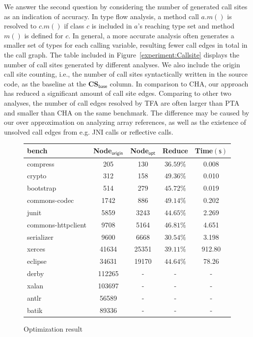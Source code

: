 \documentclass{llncs}
\begin{document}
We answer the second question by considering the number of generated call sites as an indication of accuracy. In type flow analysis, a method call $a.m()$ is resolved to $c.m()$ if class $c$ is included in $a$'s reaching type set and method $m()$ is defined for $c$. In general, a more accurate analysis often generates a smaller set of types for each calling variable, resulting fewer call edges in total in the call graph. The table included in Figure~\ref{experiment:Callsite} displays the number of call sites generated by different analyses. We also include the origin call site counting, i.e., the number of call sites syntactically written in the source code, as the baseline at the \textbf{CS$_{\textsf{base}}$} column. In comparison to CHA, our approach has reduced a significant amount of call site edges.
Comparing to other two analyses, the number of call edges resolved by TFA are often larger than PTA and smaller than CHA on the same benchmark. The difference may be caused by our over approximation on analyzing array references, as well as the existence of unsolved call edges from e.g. JNI calls or reflective calls.


\begin{figure}[t!]
  \centering
\begin{tabular}{lcccc}
	\hline
	\textbf{bench} & \textbf{Node$_{\textsf{origin}}$} & \textbf{Node$_{\textsf{opt}}$} & \textbf{Reduce} & \hspace{2pt}\textbf{Time$(\textsf{s})$} \\
	\hline
	compress & 205 & 130 & $36.59\%$ & 0.008 \\
	crypto & 312 & 158 & $49.36\%$ & 0.010 \\
	bootstrap & 514 & 279 & $45.72\%$ & 0.019 \\
	commons-codec & 1742 & 886 & $49.14\%$ & 0.202 \\
	junit & 5859 & 3243 & $44.65\%$ & 2.269 \\
	commons-httpclient & 9708 & 5164 & $46.81\%$ & 4.651 \\
	serializer & 9600 & 6668 & $30.54\%$ & 3.198 \\
	xerces & 41634 & 25351 & $39.11\%$ & 912.80\\
	eclipse & 34631 & 19170 & $44.64\%$ & 78.26\\
	derby & 112265 & - & - & -\\
	xalan & 103697 & - & - & -\\
	antlr & 56589 & - & - & -\\
	batik & 89336 & - & - & -\\
	\hline
\end{tabular}
\caption{Optimization result}
\label{experiment:Optimalization}
\end{figure}
\end{document}
